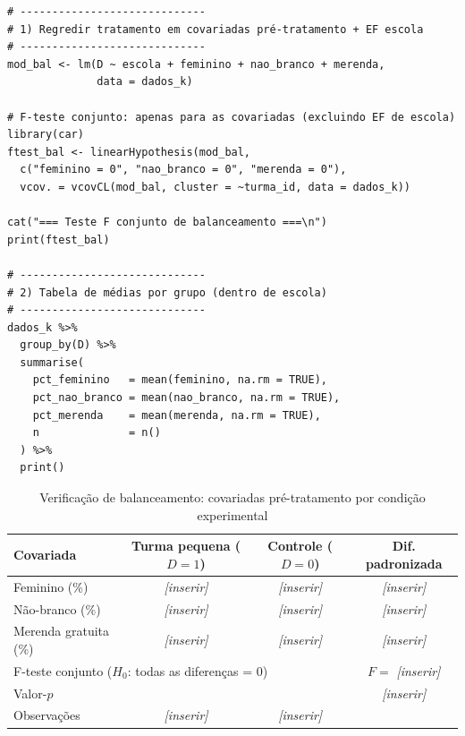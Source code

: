 \begin{lstlisting}[style=Rstyle, caption={F-teste de balanceamento de covariadas}]
# -----------------------------
# 1) Regredir tratamento em covariadas pré-tratamento + EF escola
# -----------------------------
mod_bal <- lm(D ~ escola + feminino + nao_branco + merenda,
              data = dados_k)

# F-teste conjunto: apenas para as covariadas (excluindo EF de escola)
library(car)
ftest_bal <- linearHypothesis(mod_bal,
  c("feminino = 0", "nao_branco = 0", "merenda = 0"),
  vcov. = vcovCL(mod_bal, cluster = ~turma_id, data = dados_k))

cat("=== Teste F conjunto de balanceamento ===\n")
print(ftest_bal)

# -----------------------------
# 2) Tabela de médias por grupo (dentro de escola)
# -----------------------------
dados_k %>%
  group_by(D) %>%
  summarise(
    pct_feminino   = mean(feminino, na.rm = TRUE),
    pct_nao_branco = mean(nao_branco, na.rm = TRUE),
    pct_merenda    = mean(merenda, na.rm = TRUE),
    n              = n()
  ) %>%
  print()
\end{lstlisting}

\begin{table}[H]
\centering
\caption{Verificação de balanceamento: covariadas pré-tratamento por condição experimental}
\label{tab:balanceamento}
\begin{tabular}{lccc}
\toprule
Covariada & Turma pequena ($D=1$) & Controle ($D=0$) & Dif. padronizada \\
\midrule
Feminino (\%)         & \textit{[inserir]} & \textit{[inserir]} & \textit{[inserir]} \\
Não-branco (\%)       & \textit{[inserir]} & \textit{[inserir]} & \textit{[inserir]} \\
Merenda gratuita (\%) & \textit{[inserir]} & \textit{[inserir]} & \textit{[inserir]} \\
\midrule
\multicolumn{3}{l}{F-teste conjunto ($H_0$: todas as diferenças = 0)}
  & $F = $ \textit{[inserir]} \\
\multicolumn{3}{l}{Valor-$p$}
  & \textit{[inserir]} \\
\midrule
Observações           & \textit{[inserir]} & \textit{[inserir]} & \\
\bottomrule
\end{tabular}

\vspace{4pt}
\end{table}

